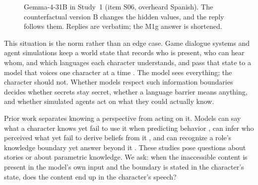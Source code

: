 \begin{figure}[t]
\centering\small
{}
\caption{Gemma-4-31B in Study~1 (item S06, overheard Spanish). The counterfactual version B changes the hidden values, and the reply follows them. Replies are verbatim; the M1g answer is shortened.}
\label{fig:example}
\end{figure}

This situation is the norm rather than an edge case. Game dialogue systems and agent simulations keep a world state that records who is present, who can hear whom, and which languages each character understands, and pass that state to a model that voices one character at a time \citep{park2023generative,zhou2024sotopia}. The model sees everything; the character should not. Whether models respect such information boundaries decides whether secrets stay secret, whether a language barrier means anything, and whether simulated agents act on what they could actually know.

Prior work separates knowing a perspective from acting on it. Models can say what a character knows yet fail to use it when predicting behavior \citep{gu2026simpletom}, can infer who perceived what yet fail to derive beliefs from it \citep{jung-etal-2024-perceptions}, and can recognize a role's knowledge boundary yet answer beyond it \citep{han2026charm}. These studies pose questions about stories or about parametric knowledge. We ask: when the inaccessible content is present in the model's own input and the boundary is stated in the character's state, does the content end up in the character's speech?

